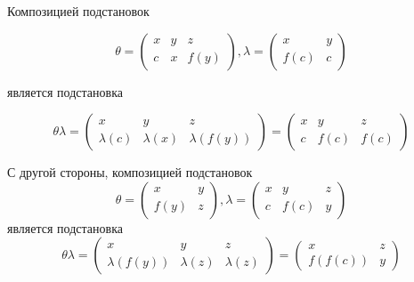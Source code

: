 \begin{example}
    Композицией подстановок

    \begin{equation*}
        \theta = \begin{pmatrix}
            x & y & z \\
            c & x & f(y)
        \end{pmatrix},
        \lambda = \begin{pmatrix}
            x & y \\
            f(c) & c 
        \end{pmatrix}
    \end{equation*}

    является подстановка

    \begin{equation*}
        \theta\lambda = \begin{pmatrix}
            x & y & z \\
            \lambda(c) & \lambda(x) & \lambda(f(y))
        \end{pmatrix}
        =
        \begin{pmatrix}
            x & y & z \\
            c & f(c) & f(c)
        \end{pmatrix}
    \end{equation*}

    С другой стороны, композицией подстановок
    \begin{equation*}
        \theta = \begin{pmatrix}
            x & y \\
            f(y) & z
        \end{pmatrix},
        \lambda = \begin{pmatrix}
            x & y & z\\
            c & f(c) & y 
        \end{pmatrix}
    \end{equation*}
    является подстановка
    \begin{equation*}
        \theta\lambda = \begin{pmatrix}
            x & y & z \\
            \lambda(f(y)) & \lambda(z) & \lambda(z)
        \end{pmatrix}
        = \begin{pmatrix}
            x & z \\
            f(f(c)) & y
        \end{pmatrix}
    \end{equation*}
\end{example}

